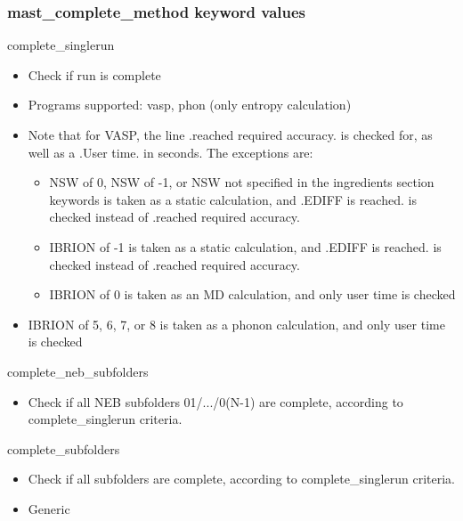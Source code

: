 \documentclass[letterpaper,10pt,english]{sphinxmanual}
\begin{document}
\subsubsection{mast\_complete\_method keyword values}
\label{3_0_inputfile:mast-complete-method-keyword-values}
complete\_singlerun
\begin{itemize}
\item {} 
Check if run is complete

\item {} 
Programs supported: vasp, phon (only entropy calculation)

\item {} 
Note that for VASP, the line .reached required accuracy. is checked for, as well as a .User time. in seconds. The exceptions are:
\begin{itemize}
\item {} 
NSW of 0, NSW of -1, or NSW not specified in the ingredients section keywords is taken as a static calculation, and .EDIFF is reached. is checked instead of .reached required accuracy.

\item {} 
IBRION of -1 is taken as a static calculation, and .EDIFF is  reached. is checked instead of .reached required accuracy.

\item {} 
IBRION of 0 is taken as an MD calculation, and only user time is checked

\end{itemize}

\item {} 
IBRION of 5, 6, 7, or 8 is taken as a phonon calculation, and only user time is checked

\end{itemize}

complete\_neb\_subfolders
\begin{itemize}
\item {} 
Check if all NEB subfolders 01/.../0(N-1) are complete, according to complete\_singlerun criteria.

\end{itemize}

complete\_subfolders
\begin{itemize}
\item {} 
Check if all subfolders are complete, according to complete\_singlerun criteria.

\item {} 
Generic

\end{itemize}
\end{document}
